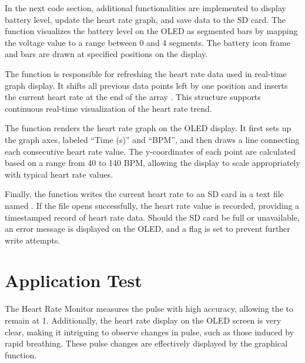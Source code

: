 In the next code section, additional functionalities are implemented to display battery level, update the heart rate graph, and save data to the SD card. The function   visualizes the battery level on the OLED as segmented bars by mapping the voltage value to a range between 0 and 4 segments. The battery icon frame and bars are drawn at specified positions on the display.

The function   is responsible for refreshing the heart rate data used in real-time graph display. It shifts all previous data points left by one position and inserts the current heart rate at the end of the array . This structure supports continuous real-time visualization of the heart rate trend.

The function   renders the heart rate graph on the OLED display. It first sets up the graph axes, labeled ``Time (s)'' and ``BPM'', and then draws a line connecting each consecutive heart rate value. The y-coordinates of each point are calculated based on a range from 40 to 140 BPM, allowing the display to scale appropriately with typical heart rate values.

Finally, the function   writes the current heart rate to an SD card in a text file named . If the file opens successfully, the heart rate value is recorded, providing a timestamped record of heart rate data. Should the SD card be full or unavailable, an error message is displayed on the OLED, and a flag is set to prevent further write attempts.

{
	
	
	
}


\section{Application Test}

The Heart Rate Monitor measures the pulse with high accuracy, allowing the  to remain at 1. Additionally, the heart rate display on the OLED screen is very clear, making it intriguing to observe changes in pulse, such as those induced by rapid breathing. These pulse changes are effectively displayed by the graphical function.


